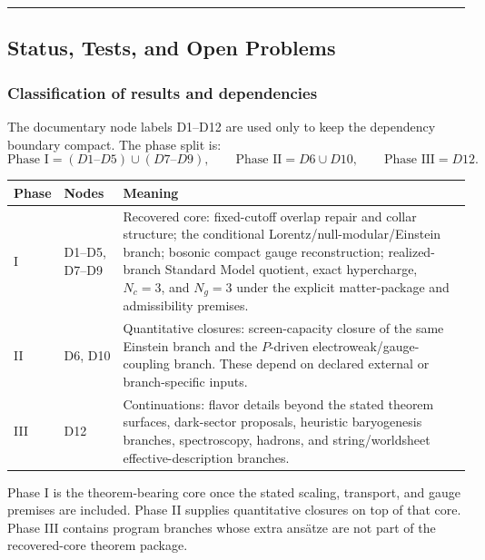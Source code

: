\begin{center}\rule{0.5\linewidth}{0.5pt}\end{center}
\subsection{Status, Tests, and Open Problems}\label{8-status-tests-and-open-problems}

\subsubsection{Classification of results and dependencies}\label{81-classification-of-results}\label{16-summary-complete-axiom-set}

The documentary node labels D1--D12 are used only to keep the dependency boundary compact. The
phase split is:
\[
\text{Phase I}=(D1\text{--}D5)\cup(D7\text{--}D9),\qquad
\text{Phase II}=D6\cup D10,\qquad
\text{Phase III}=D12.
\]

\begin{center}
\scriptsize
\setlength{\tabcolsep}{3pt}
\begin{tabular}{@{}>{\RaggedRight\arraybackslash}p{}>{\RaggedRight\arraybackslash}p{}>{\RaggedRight\arraybackslash}p{}@{}}
\toprule
Phase & Nodes & Meaning \\
\midrule
I & D1--D5, D7--D9 & Recovered core: fixed-cutoff overlap repair and collar structure; the conditional Lorentz/null-modular/Einstein branch; bosonic compact gauge reconstruction; realized-branch Standard Model quotient, exact hypercharge, \(N_c=3\), and \(N_g=3\) under the explicit matter-package and admissibility premises. \\
II & D6, D10 & Quantitative closures: screen-capacity closure of the same Einstein branch and the \(P\)-driven electroweak/gauge-coupling branch. These depend on declared external or branch-specific inputs. \\
III & D12 & Continuations: flavor details beyond the stated theorem surfaces, dark-sector proposals, heuristic baryogenesis branches, spectroscopy, hadrons, and string/worldsheet effective-description branches. \\
\bottomrule
\end{tabular}
\end{center}

Phase I is the theorem-bearing core once the stated scaling, transport, and gauge premises are
included. Phase II supplies quantitative closures on top of that core. Phase III contains
program branches whose extra ans\"atze are not part of the recovered-core theorem package.

